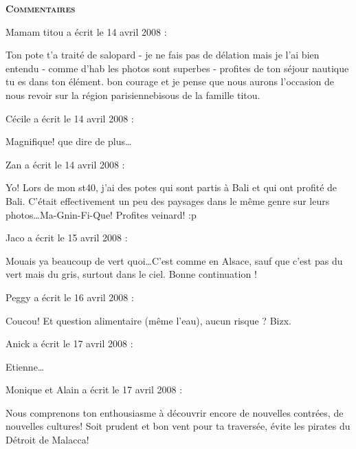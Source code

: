 \bigskip
\textbf{\textsc{Commentaires}}

\medskip
Mamam titou a écrit le 14 avril 2008 :
\begin{displayquote}
Ton pote t'a traité de salopard - je ne fais pas de  délation mais je l'ai bien entendu - comme d'hab les photos sont superbes - profites de ton séjour nautique tu es dans ton élément. bon courage et je pense que nous aurons l'occasion de nous revoir sur la région parisienne\dotsgros bisous de la famille titou.
\end{displayquote}

\medskip
Cécile a écrit le 14 avril 2008 :
\begin{displayquote}
Magnifique! que dire de plus\dots
\end{displayquote}

\medskip
Zan a écrit le 14 avril 2008 :
\begin{displayquote}
Yo!
Lors de mon st40, j'ai des potes qui sont partis à Bali et qui ont profité de Bali. C'était effectivement un peu des paysages dans le même genre sur leurs photos\dots Ma-Gnin-Fi-Que!
Profites veinard! :p
\end{displayquote}

\medskip
Jaco a écrit le 15 avril 2008 :
\begin{displayquote}
Mouais ya beaucoup de vert quoi\dots C'est comme en Alsace, sauf que c'est pas du vert mais du gris, surtout dans le ciel.
Bonne continuation !
\end{displayquote}

\medskip
Peggy a écrit le 16 avril 2008 :
\begin{displayquote}
Coucou!
Et question alimentaire (même l'eau), aucun risque ?
Bizx.
\end{displayquote}

\medskip
Anick a écrit le 17 avril 2008 :
\begin{displayquote}
Etienne\dots
\end{displayquote}

\medskip
Monique et Alain a écrit le 17 avril 2008 :
\begin{displayquote}
Nous comprenons ton enthousiasme à découvrir encore de nouvelles contrées, de nouvelles cultures! Soit prudent et bon vent pour ta traversée, évite les pirates du Détroit de Malacca!
\end{displayquote}

